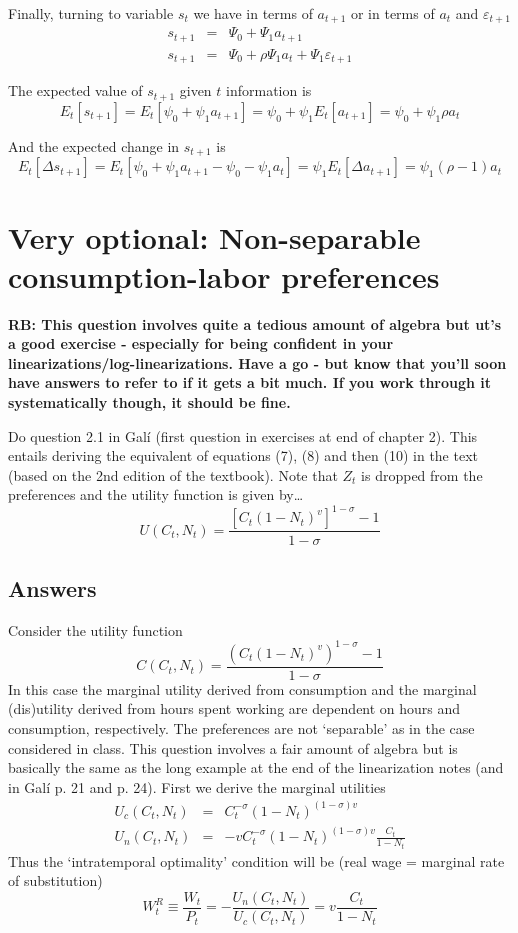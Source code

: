 \documentclass[authoryear,11pt]{elsarticle}
\begin{document}
Finally, turning to variable $s_{t}$ we have in terms of $a_{t+1}$ or in terms of $a_{t}$ and $\varepsilon_{t+1}$
\begin{eqnarray*}
s_{t+1} &=& \Psi_{0} + \Psi_{1} a_{t+1}	\\
s_{t+1} &=& \Psi_{0} + \rho \Psi_{1} a_{t} + \Psi_{1} \varepsilon_{t+1}
\end{eqnarray*}

The expected value of $s_{t+1}$ given $t$ information is
\[
E_{t}[s_{t+1}] = E_{t}[ \psi_{0} + \psi_{1} a_{t+1} ] = \psi_{0} + \psi_{1} E_{t}[ a_{t+1}] = \psi_{0} + \psi_{1} \rho a_{t}
\]

And the expected change in $s_{t+1}$ is
\[
E_{t}[ \Delta s_{t+1} ] = E_{t}[  \psi_{0} + \psi_{1} a_{t+1}  -  \psi_{0} - \psi_{1} a_{t} ] = \psi_{1} E_{t}[\Delta a_{t+1}] = \psi_{1} (\rho-1) a_{t}
\]

\section{Very optional: Non-separable consumption-labor preferences}
\textbf{RB: This question involves quite a tedious amount of algebra but ut's a good exercise - especially for being confident in your linearizations/log-linearizations. Have a go - but know that you'll soon have answers to refer to if it gets a bit much. If you work through it systematically though, it should be fine.}

Do question 2.1 in Gal\'i (first question in exercises at end of chapter 2). This entails deriving the equivalent of equations (7), (8) and then (10) in the text (based on the 2nd edition of the textbook). Note that $Z_{t}$ is dropped from the preferences and the utility function is given by\ldots
\[
U(C_{t},N_{t}) = \frac{\left[ C_{t} \left( 1-N_{t} \right)^{v} \right]^{1-\sigma}-1}{1-\sigma}
\]

\subsection*{Answers}
Consider the utility function
\[
C(C_{t},N_{t}) = \frac{(C_{t}(1-N_{t})^{v})^{1-\sigma}-1}{1-\sigma}
\]
In this case the marginal utility derived from consumption and the marginal (dis)utility derived from hours spent working are dependent on hours and consumption, respectively. The preferences are not `separable' as in the case considered in class. This question involves a fair amount of algebra but is basically the same as the long example at the end of the linearization notes (and in Gal\'i p. 21 and p. 24). First we derive the marginal utilities
\begin{eqnarray*}
U_{c}(C_{t},N_{t}) &=& C_{t}^{-\sigma}(1-N_{t})^{(1-\sigma)v} \\
U_{n}(C_{t},N_{t}) &=& -vC_{t}^{-\sigma}(1-N_{t})^{(1-\sigma)v}\frac{C_{t}}{1-N_{t}}
\end{eqnarray*}
Thus the `intratemporal optimality' condition will be (real wage = marginal rate of substitution)
\[
W^{R}_{t} \equiv \frac{W_{t}}{P_{t}} = - \frac{U_{n}(C_{t},N_{t})}{U_{c}(C_{t},N_{t})} = v \frac{C_{t}}{1-N_{t}}
\]
\end{document}
